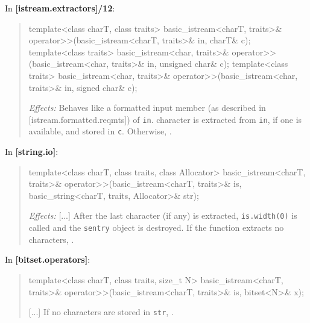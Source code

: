 \documentclass{wg21}
\begin{document}
In \textbf{[istream.extractors]/12}:
\begin{quote}
\begin{codeblock}
template<class charT, class traits>
  basic_istream<charT, traits>& operator>>(basic_istream<charT, traits>& in, charT& c);
template<class traits>
  basic_istream<char, traits>& operator>>(basic_istream<char, traits>& in, unsigned char& c);
template<class traits>
  basic_istream<char, traits>& operator>>(basic_istream<char, traits>& in, signed char& c);
\end{codeblock}
\textit{Effects:} Behaves like a formatted input member (as described in [istream.formatted.reqmts])
of \texttt{in}.  character
is extracted from \texttt{in}, if one is available, and stored in \texttt{c}.
Otherwise, .
\end{quote}

In \textbf{[string.io]}:
\begin{quote}
\begin{codeblock}
template<class charT, class traits, class Allocator>
  basic_istream<charT, traits>&
    operator>>(basic_istream<charT, traits>& is, basic_string<charT, traits, Allocator>& str);
\end{codeblock}
\textit{Effects:} [...]
After the last character (if any) is extracted, \texttt{is.width(0)} is called
and the \texttt{sentry} object is destroyed. If the function extracts no characters,
.
\end{quote}

In \textbf{[bitset.operators]}:
\begin{quote}
\begin{codeblock}
template<class charT, class traits, size_t N>
  basic_istream<charT, traits>&
    operator>>(basic_istream<charT, traits>& is, bitset<N>& x);
\end{codeblock}
[...]
If no characters are stored in \texttt{str}, .
\end{quote}
\end{document}
